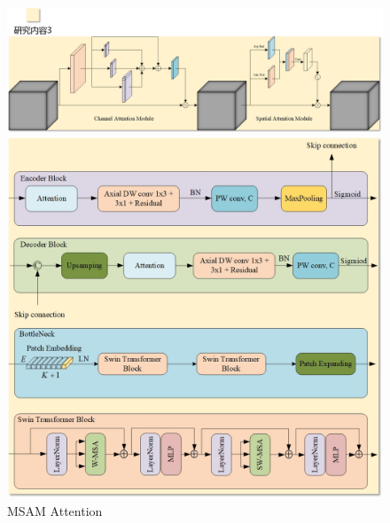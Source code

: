 \documentclass[CJK,aspectratio=169]{beamer}  %
\begin{document}
	\begin{frame}
	
		\begin{figure}
			\centering			
			\begin{minipage}{.45\columnwidth}
				\setlength{\abovecaptionskip}{0.2cm}
				\centering
				\includegraphics[width=\textwidth]{picture/LLIE/Experiment/Attention/MSAM}
				\caption*{\tiny MSAM Attention}
			\end{minipage}
			\begin{minipage}{.45\columnwidth}
				\setlength{\abovecaptionskip}{-0.05cm}
				\centering
				\includegraphics[width=\textwidth]{picture/LLIE/My Architecture/Encoder_Decoder}
			\end{minipage}
		\end{figure}
			
	\end{frame}
	
\end{document}
